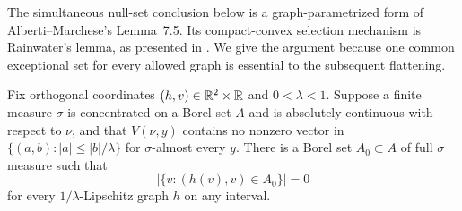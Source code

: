 The simultaneous null-set conclusion below is a graph-parametrized form of
Alberti--Marchese's Lemma~7.5.  Its compact-convex selection mechanism
is Rainwater's lemma, as presented in
\cite[Lemma~7.1 and Corollary~7.2]{AlbertiMarchese2016}.
We give the argument because one common exceptional set for every
allowed graph is essential to the subsequent flattening.

\begin{lemma}\label{hp:cone-null}
Fix orthogonal coordinates $(h,v)\in\mathbb R^2\times\mathbb R$ and
$0<\lambda<1$.  Suppose a finite measure $\sigma$ is concentrated on a
Borel set $A$ and is absolutely continuous with respect to $\nu$,
and that $V(\nu,y)$ contains no nonzero vector in
$\{(a,b):|a|\le |b|/\lambda\}$ for $\sigma$-almost every $y$.
There is a Borel set $A_0\subset A$ of full $\sigma$ measure such that
\begin{equation}\label{hp:graph-null}
 \bigl|\{v:(h(v),v)\in A_0\}\bigr|=0
\end{equation}
for every $1/\lambda$-Lipschitz graph $h$ on any interval.
\end{lemma}

